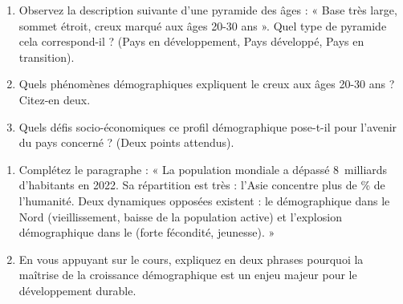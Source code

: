 \documentclass[11pt]{article}
\begin{document}
\begin{exercice}
\begin{enumerate}
    \item Observez la description suivante d'une pyramide des âges : « Base très large, sommet étroit, creux marqué aux âges 20-30 ans ». Quel type de pyramide cela correspond-il ? (Pays en développement, Pays développé, Pays en transition).
    \item Quels phénomènes démographiques expliquent le creux aux âges 20-30 ans ? Citez-en deux.
    \item Quels défis socio-économiques ce profil démographique pose-t-il pour l'avenir du pays concerné ? (Deux points attendus).
\end{enumerate}
\end{exercice}

\begin{exercice}
\begin{enumerate}
    \item Complétez le paragraphe : « La population mondiale a dépassé \SI{8}{milliards} d'habitants en 2022. Sa répartition est très \underline{\hspace{3cm}} : l'Asie concentre plus de \underline{\hspace{2cm}}\% de l'humanité. Deux dynamiques opposées existent : le \underline{\hspace{3cm}} démographique dans le Nord (vieillissement, baisse de la population active) et l'explosion démographique dans le \underline{\hspace{2cm}} (forte fécondité, jeunesse). »
    \item En vous appuyant sur le cours, expliquez en deux phrases pourquoi la maîtrise de la croissance démographique est un enjeu majeur pour le développement durable.
\end{enumerate}
\end{exercice}
\end{document}

